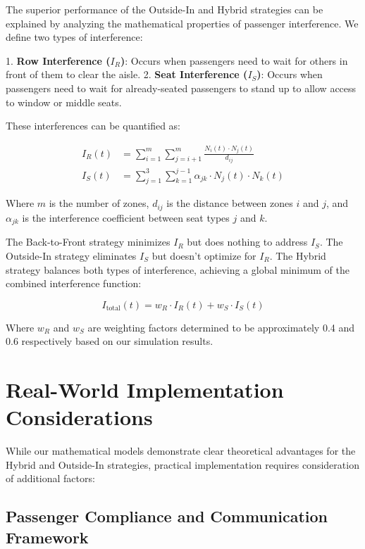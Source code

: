\documentclass[12pt]{article}
\begin{document}
The superior performance of the Outside-In and Hybrid strategies can be explained by analyzing the mathematical properties of passenger interference. We define two types of interference:

1. \textbf{Row Interference ($I_R$)}: Occurs when passengers need to wait for others in front of them to clear the aisle.
2. \textbf{Seat Interference ($I_S$)}: Occurs when passengers need to wait for already-seated passengers to stand up to allow access to window or middle seats.

These interferences can be quantified as:

\begin{align}
I_R(t) &= \sum_{i=1}^{m} \sum_{j=i+1}^{m} \frac{N_i(t) \cdot N_j(t)}{d_{ij}} \\
I_S(t) &= \sum_{j=1}^{3} \sum_{k=1}^{j-1} \alpha_{jk} \cdot N_j(t) \cdot N_k(t)
\end{align}

Where $m$ is the number of zones, $d_{ij}$ is the distance between zones $i$ and $j$, and $\alpha_{jk}$ is the interference coefficient between seat types $j$ and $k$.

The Back-to-Front strategy minimizes $I_R$ but does nothing to address $I_S$. The Outside-In strategy eliminates $I_S$ but doesn't optimize for $I_R$. The Hybrid strategy balances both types of interference, achieving a global minimum of the combined interference function:

\begin{equation}
I_{\text{total}}(t) = w_R \cdot I_R(t) + w_S \cdot I_S(t)
\end{equation}

Where $w_R$ and $w_S$ are weighting factors determined to be approximately 0.4 and 0.6 respectively based on our simulation results.

\section{Real-World Implementation Considerations}

While our mathematical models demonstrate clear theoretical advantages for the Hybrid and Outside-In strategies, practical implementation requires consideration of additional factors:

\subsection{Passenger Compliance and Communication Framework}
\end{document}
